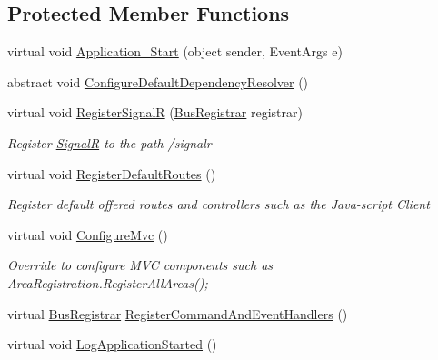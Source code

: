 \subsection*{Protected Member Functions}
\begin{DoxyCompactItemize}
\item 
virtual void \hyperlink{classCqrs_1_1WebApi_1_1CqrsHttpApplication_a234e82de913e082edc4a90207d901e2a_a234e82de913e082edc4a90207d901e2a}{Application\+\_\+\+Start} (object sender, Event\+Args e)
\item 
abstract void \hyperlink{classCqrs_1_1WebApi_1_1CqrsHttpApplication_a8dc48dbd1e33323c2d163f0e4719b845_a8dc48dbd1e33323c2d163f0e4719b845}{Configure\+Default\+Dependency\+Resolver} ()
\item 
virtual void \hyperlink{classCqrs_1_1WebApi_1_1CqrsHttpApplication_ad47fbc81b57345f9998345a2e270da5c_ad47fbc81b57345f9998345a2e270da5c}{Register\+SignalR} (\hyperlink{classCqrs_1_1Configuration_1_1BusRegistrar}{Bus\+Registrar} registrar)
\begin{DoxyCompactList}\small\item\em Register \hyperlink{namespaceCqrs_1_1WebApi_1_1SignalR}{SignalR} to the path /signalr \end{DoxyCompactList}\item 
virtual void \hyperlink{classCqrs_1_1WebApi_1_1CqrsHttpApplication_afaeb2e7a6c5e3e65ef1ff23ae6224070_afaeb2e7a6c5e3e65ef1ff23ae6224070}{Register\+Default\+Routes} ()
\begin{DoxyCompactList}\small\item\em Register default offered routes and controllers such as the Java-\/script Client \end{DoxyCompactList}\item 
virtual void \hyperlink{classCqrs_1_1WebApi_1_1CqrsHttpApplication_ab8b7cc0d6638a3a29f20c2186b08ca77_ab8b7cc0d6638a3a29f20c2186b08ca77}{Configure\+Mvc} ()
\begin{DoxyCompactList}\small\item\em Override to configure M\+VC components such as Area\+Registration.\+Register\+All\+Areas(); \end{DoxyCompactList}\item 
virtual \hyperlink{classCqrs_1_1Configuration_1_1BusRegistrar}{Bus\+Registrar} \hyperlink{classCqrs_1_1WebApi_1_1CqrsHttpApplication_a47a242f0cb58976b13dc2d0dbe1cd89f_a47a242f0cb58976b13dc2d0dbe1cd89f}{Register\+Command\+And\+Event\+Handlers} ()
\item 
virtual void \hyperlink{classCqrs_1_1WebApi_1_1CqrsHttpApplication_a92e8ee7fef861d2eeec741b0f46b9d1f_a92e8ee7fef861d2eeec741b0f46b9d1f}{Log\+Application\+Started} ()

\end{DoxyCompactItemize}
